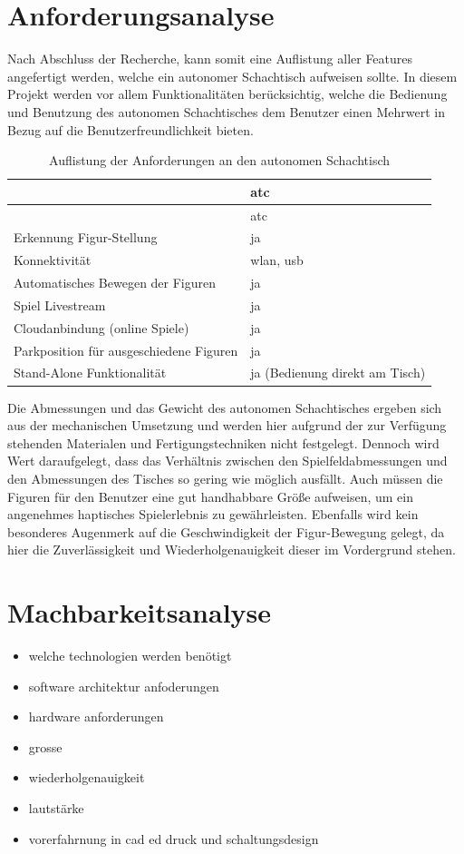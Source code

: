 \hypertarget{anforderungsanalyse}{%
\chapter{Anforderungsanalyse}\label{anforderungsanalyse}}

Nach Abschluss der Recherche, kann somit eine Auflistung aller Features
angefertigt werden, welche ein autonomer Schachtisch aufweisen sollte.
In diesem Projekt werden vor allem Funktionalitäten berücksichtig,
welche die Bedienung und Benutzung des autonomen Schachtisches dem
Benutzer einen Mehrwert in Bezug auf die Benutzerfreundlichkeit bieten.

\begin{longtable}[]{@{}ll@{}}
\caption{Auflistung der Anforderungen an den autonomen
Schachtisch}\tabularnewline
\toprule
& \gls{atc}\tabularnewline
\midrule
\endfirsthead
\toprule
& \gls{atc}\tabularnewline
\midrule
\endhead
Erkennung Figur-Stellung & ja\tabularnewline
Konnektivität & \gls{wlan}, \gls{usb}\tabularnewline
Automatisches Bewegen der Figuren & ja\tabularnewline
Spiel Livestream & ja\tabularnewline
Cloudanbindung (online Spiele) & ja\tabularnewline
Parkposition für ausgeschiedene Figuren & ja\tabularnewline
Stand-Alone Funktionalität & ja (Bedienung direkt am
Tisch)\tabularnewline
\bottomrule
\end{longtable}

Die Abmessungen und das Gewicht des autonomen Schachtisches ergeben sich
aus der mechanischen Umsetzung und werden hier aufgrund der zur
Verfügung stehenden Materialen und Fertigungstechniken nicht festgelegt.
Dennoch wird Wert daraufgelegt, dass das Verhältnis zwischen den
Spielfeldabmessungen und den Abmessungen des Tisches so gering wie
möglich ausfällt. Auch müssen die Figuren für den Benutzer eine gut
handhabbare Größe aufweisen, um ein angenehmes haptisches Spielerlebnis
zu gewährleisten. Ebenfalls wird kein besonderes Augenmerk auf die
Geschwindigkeit der Figur-Bewegung gelegt, da hier die Zuverlässigkeit
und Wiederholgenauigkeit dieser im Vordergrund stehen.

\hypertarget{machbarkeitsanalyse}{%
\chapter{Machbarkeitsanalyse}\label{machbarkeitsanalyse}}

\begin{itemize}
\tightlist
\item
  welche technologien werden benötigt
\item
  software architektur anfoderungen
\item
  hardware anforderungen
\item
  grosse
\item
  wiederholgenauigkeit
\item
  lautstärke
\item
  vorerfahrnung in cad ed druck und schaltungsdesign
\end{itemize}

